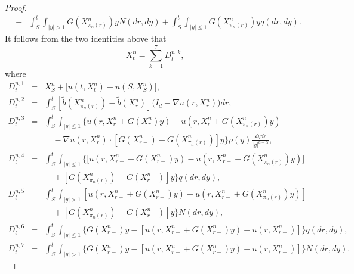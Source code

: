 \documentclass[11pt]{amsart}
\theoremstyle{plain}
\numberwithin{equation}{section}
\begin{document}
\begin{proof}
\begin{eqnarray*}
&+&\int_{S}^{t}\int_{\left\vert y\right\vert >1}G\left( X_{\pi _{n}\left(
r\right) }^{n}\right) yN\left( dr,dy\right) +\int_{S}^{t}\int_{\left\vert
y\right\vert \leq 1}G\left( X_{\pi _{n}\left( r\right) }^{n}\right) yq\left(
dr,dy\right) .
\end{eqnarray*}It follows from the two identities above that\begin{equation*}
X_{t}^{n}=\sum_{k=1}^{7}D_{t}^{n,k},
\end{equation*}where\begin{eqnarray*}
D_{t}^{n,1} &=&X_{S}^{n}+\big[u\left( t,X_{t}^{n}\right) -u\left(
S,X_{S}^{n}\right) \big], \\
D_{t}^{n,2} &=&\int_{S}^{t}\left[ \tilde{b}\left( X_{\pi _{n}\left( r\right)
}^{n}\right) -\tilde{b}\left( X_{r}^{n}\right) \right] \big(I_{d}-\nabla
u\left( r,X_{r}^{n}\right) \big)dr, \\
D_{t}^{n,3} &=&\int_{S}^{t}\int_{\left\vert y\right\vert \leq 1}\{u\left(
r,X_{r}^{n}+G\left( X_{r}^{n}\right) y\right) -u\left( r,X_{r}^{n}+G\left(
X_{\pi _{n}\left( r\right) }^{n}\right) y\right) \\
&&\quad -\nabla u\left( r,X_{r}^{n}\right) \cdot \left[ G\left(
X_{r-}^{n}\right) -G\left( X_{\pi _{n}\left( r\right) }^{n}\right) \right]
y\}\rho \left( y\right) \frac{dydr}{\left\vert y\right\vert ^{d+\alpha }}, \\
D_{t}^{n,4} &=&\int_{S}^{t}\int_{\left\vert y\right\vert \leq 1}\Big\{\lbrack u\left( r,X_{r-}^{n}+G\left( X_{r-}^{n}\right) y\right) -u\left(
r,X_{r-}^{n}+G\left( X_{\pi _{n}\left( r\right) }^{n}\right) y\right) ] \\
&&\quad +[G\left( X_{\pi _{n}\left( r\right) }^{n}\right) -G\left(
X_{r-}^{n}\right) ]y\Big\}q\left( dr,dy\right) , \\
D_{t}^{n,5} &=&\int_{S}^{t}\int_{\left\vert y\right\vert >1}[u\left(
r,X_{r-}^{n}+G\left( X_{r-}^{n}\right) y\right) -u\left(
r,X_{r-}^{n}+G\left( X_{\pi _{n}\left( r\right) }^{n}\right) y\right) ] \\
&&\quad +[G\left( X_{\pi _{n}\left( r\right) }^{n}\right) -G\left(
X_{r-}^{n}\right) ]y\Big\}N\left( dr,dy\right) , \\
D_{t}^{n,6} &=&\int_{S}^{t}\int_{\left\vert y\right\vert \leq 1}\Big\{G\left( X_{r-}^{n}\right) y-\left[ u\left( r,X_{r-}^{n}+G\left(
X_{r-}^{n}\right) y\right) -u\left( r,X_{r-}^{n}\right) \right] \Big\}q\left( dr,dy\right) , \\
D_{t}^{n,7} &=&\int_{S}^{t}\int_{\left\vert y\right\vert >1}\Big\{G\left(
X_{r-}^{n}\right) y-\left[ u\left( r,X_{r-}^{n}+G\left( X_{r-}^{n}\right)
y\right) -u\left( r,X_{r-}^{n}\right) \right] \Big\}N\left( dr,dy\right) .
\end{eqnarray*}


\end{proof}
\end{document}
